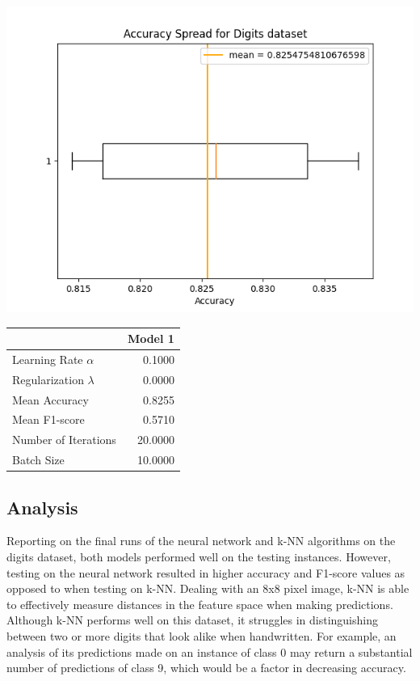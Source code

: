 \documentclass{article}
\begin{document}
\begin{minipage}{0.49\textwidth}
    \centering
    \includegraphics*[width=\textwidth]{./src/figures/Digits dataset_variant.png}
\end{minipage}
\hfill
\begin{minipage}{0.49\textwidth}
    \centering
    \begin{tabular}{lr}
        \toprule
         & Model 1 \\
        \midrule
        Learning Rate $\alpha$ & 0.1000 \\
        Regularization $\lambda$ & 0.0000 \\
        Mean Accuracy & 0.8255 \\
        Mean F1-score & 0.5710 \\
        Number of Iterations & 20.0000 \\
        Batch Size & 10.0000 \\
        \bottomrule
        \end{tabular}
\end{minipage}

\subsection*{Analysis}
Reporting on the final runs of the neural network and k-NN algorithms on the digits dataset, both models performed well on the testing instances.
However, testing on the neural network resulted in higher accuracy and F1-score values as opposed to when testing on k-NN.
Dealing with an 8x8 pixel image, k-NN is able to effectively measure distances in the feature space when making predictions.
Although k-NN performs well on this dataset, it struggles in distinguishing between two or more digits that look alike when handwritten.
For example, an analysis of its predictions made on an instance of class 0 may return a substantial number of predictions of class 9, which would be a factor in decreasing accuracy.
\\
\end{document}
